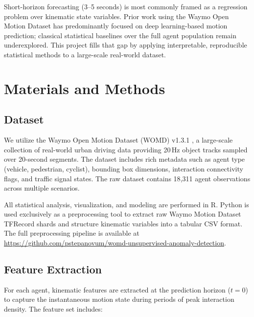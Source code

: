 \documentclass[conference]{IEEEtran}
\begin{document}
Short-horizon forecasting (3--5 seconds) is most commonly framed as a regression problem over kinematic state variables. Prior work using the Waymo Open Motion Dataset \cite{ettinger2021waymo, sun2020scalability} has predominantly focused on deep learning-based motion prediction; classical statistical baselines over the full agent population remain underexplored. This project fills that gap by applying interpretable, reproducible statistical methods to a large-scale real-world dataset.

\section{Materials and Methods}

\subsection{Dataset}

We utilize the Waymo Open Motion Dataset (WOMD) v1.3.1 \cite{waymo_motion_dataset, sun2020scalability}, a large-scale collection of real-world urban driving data providing 20\,Hz object tracks sampled over 20-second segments. The dataset includes rich metadata such as agent type (vehicle, pedestrian, cyclist), bounding box dimensions, interaction connectivity flags, and traffic signal states. The raw dataset contains 18{,}311 agent observations across multiple scenarios.

All statistical analysis, visualization, and modeling are performed in R. Python is used exclusively as a preprocessing tool to extract raw Waymo Motion Dataset TFRecord shards and structure kinematic variables into a tabular CSV format. The full preprocessing pipeline is available at \url{https://github.com/pstepanovum/womd-unsupervised-anomaly-detection}.

\subsection{Feature Extraction}

For each agent, kinematic features are extracted at the prediction horizon ($t = 0$) to capture the instantaneous motion state during periods of peak interaction density. The feature set includes:
\end{document}
